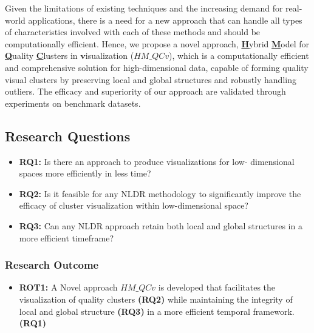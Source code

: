 Given the limitations of existing techniques and the increasing demand for real-world applications, there is a need for a new approach that can handle all types of characteristics involved with each of these methods and should be computationally efficient. Hence, we propose a novel approach, \textbf{\underline{H}}ybrid \textbf{\underline{M}}odel for \textbf{\underline{Q}}uality \textbf{\underline{C}}lusters in \underline{$\bm{v}$}isualization ($HM\_QCv$), which is a computationally efficient and comprehensive solution for high-dimensional data, capable of forming quality visual clusters by preserving local and global structures and robustly handling outliers. The efficacy and superiority of our approach are validated through experiments on benchmark datasets.



\subsection{Research Questions}
\begin{itemize}
    \item \textbf{RQ1:} Is there an approach to produce visualizations for low- dimensional spaces more efficiently in less time?
    \item \textbf{RQ2:} Is it feasible for any NLDR methodology to significantly improve the efficacy of cluster visualization within low-dimensional space? 
    \item \textbf{RQ3:} Can any NLDR approach retain both local and global structures in a more efficient timeframe?
\end{itemize} 




\subsubsection{Research Outcome}
\begin{itemize}

\item \textbf{ROT1:} A Novel approach $HM\_QCv$ is developed that facilitates the visualization of quality clusters \textbf{(RQ2)} while maintaining the integrity of local and global structure \textbf{(RQ3)} in a more efficient temporal framework. \textbf{(RQ1)}

\end{itemize}  


